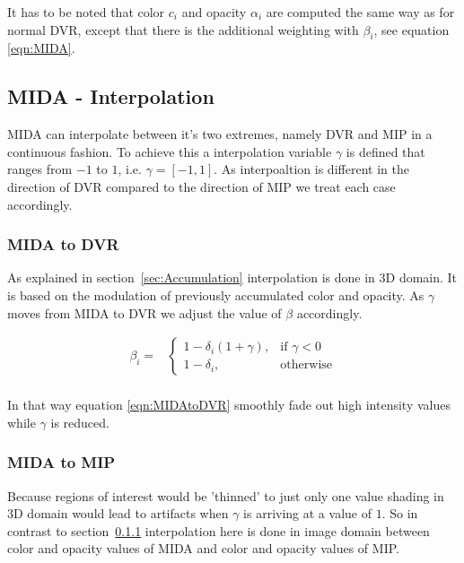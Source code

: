 It has to be noted that color $c_i$ and opacity $\alpha_i$ are computed the same way as for normal DVR, except that there is the additional weighting with $\beta_i$, see equation \eqref{eqn:MIDA}.

\subsection{MIDA - Interpolation}

MIDA can interpolate between it's two extremes, namely DVR and MIP in a continuous fashion.
To achieve this a interpolation variable $\gamma$ is defined that ranges from $-1$ to $1$, i.e. $\gamma=[-1,1]$.
As interpoaltion is different in the direction of DVR compared to the direction of MIP we treat each case accordingly. 

\subsubsection{MIDA to DVR}
\label{seq:MIDAtoDVR}

As explained in section~\ref{sec:Accumulation} interpolation is done in 3D domain. It is based on the modulation of previously accumulated color and opacity. As $\gamma$ moves from MIDA to DVR we adjust the value of $\beta$ accordingly.

\begin{equation}
	\begin{aligned}
	\beta_i = & \begin{cases}
	1 - \delta_i (1 + \gamma), & \text{if $\gamma < 0$}\\
	1 - \delta_i, & \text{otherwise}
	\end{cases} \\
	\end{aligned}
\label{eqn:MIDAtoDVR}
\end{equation}

In that way equation \eqref{eqn:MIDAtoDVR} smoothly fade out high intensity values while $\gamma$ is reduced.

\subsubsection{MIDA to MIP}

Because regions of interest would be 'thinned' to just only one value shading in 3D domain would lead to artifacts when $\gamma$ is arriving at a value of $1$.
So in contrast to section~\ref{seq:MIDAtoDVR} interpolation here is done in image domain between color and opacity values of MIDA and color and opacity values of MIP. 


